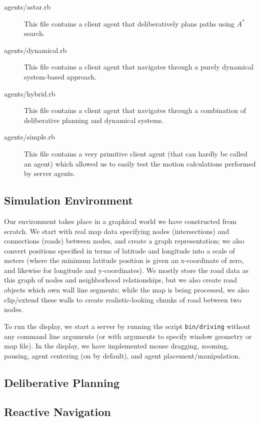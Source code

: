 \documentclass{article}
\newcommand{\code}{\texttt}
\begin{document}
\begin{description}
\item[agents/astar.rb] This file contains a client agent that deliberatively
  plans paths using $A^*$ search.

\item[agents/dynamical.rb] This file contains a client agent that navigates
  through a purely dynamical system-based approach.

\item[agents/hybrid.rb] This file contains a client agent that navigates through
  a combination of deliberative planning and dynamical systems.

\item[agents/simple.rb] This file contains a very primitive client agent (that
  can hardly be called an agent) which allowed us to easily test the motion
  calculations performed by server agents.

\end{description}

\subsection{Simulation Environment}

Our environment takes place in a graphical world we have constructed from
scratch. We start with real map data specifying nodes (intersections) and
connections (roads) between nodes, and create a graph representation; we also
convert positions specified in terms of latitude and longitude into a scale of
meters (where the minimum latitude position is given an x-coordinate of zero,
and likewise for longitude and y-coordinates). We mostly store the road data as
this graph of nodes and neighborhood relationships, but we also create road
objects which own wall line segments; while the map is being processed, we also
clip/extend these walls to create realistic-looking chunks of road between two
nodes.

To run the display, we start a server by running the script \code{bin/driving}
without any command line arguments (or with arguments to specify window geometry
or map file). In the display, we have implemented mouse dragging, zooming,
pausing, agent centering (on by default), and agent placement/manipulation.


\subsection{Deliberative Planning}

\subsection{Reactive Navigation}
\end{document}
